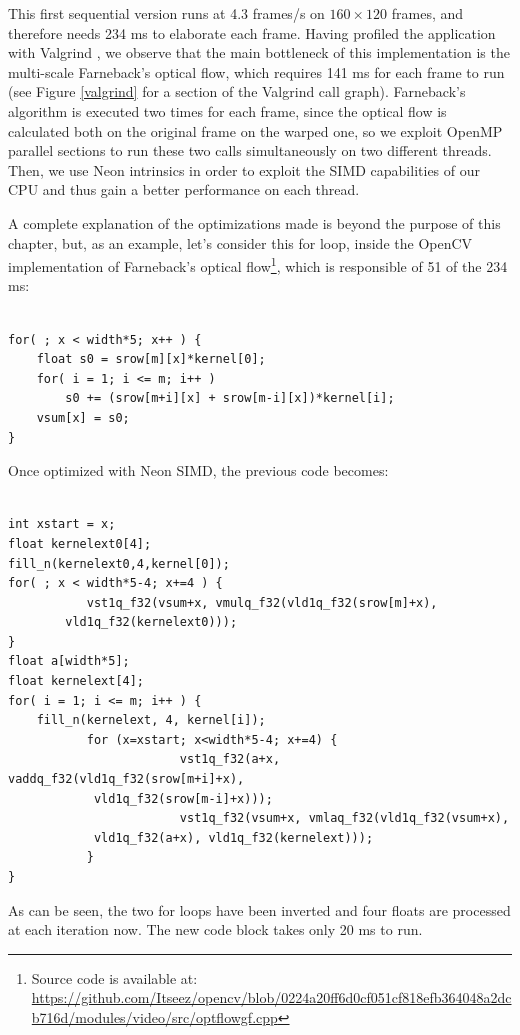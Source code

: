 This first sequential version runs at 4.3 frames/s on $160\times 120$ frames, and therefore needs 234 ms to elaborate each frame. Having profiled the application with Valgrind \cite{nethercote2007valgrind}, we observe that the main bottleneck of this implementation is the multi-scale Farneback's optical flow, which requires 141 ms for each frame to run (see Figure \ref{valgrind} for a section of the Valgrind call graph). Farneback's algorithm is executed two times for each frame, since the optical flow is calculated both on the original frame on the warped one, so we exploit OpenMP parallel sections to run these two calls simultaneously on two different threads. Then, we use Neon intrinsics in order to exploit the SIMD capabilities of our CPU and thus gain a better performance on each thread.

A complete explanation of the optimizations made is beyond the purpose of this chapter, but, as an example, let's consider this for loop, inside the OpenCV implementation of Farneback's optical flow\footnote{Source code is available at: \url{https://github.com/Itseez/opencv/blob/0224a20ff6d0cf051cf818efb364048a2dcb716d/modules/video/src/optflowgf.cpp}}, which is responsible of 51 of the 234 ms:
\begin{lstlisting}[frame=single]  % Start your code-block

for( ; x < width*5; x++ ) {
	float s0 = srow[m][x]*kernel[0];
	for( i = 1; i <= m; i++ )
		s0 += (srow[m+i][x] + srow[m-i][x])*kernel[i];
	vsum[x] = s0;
}
\end{lstlisting}

Once optimized with Neon SIMD, the previous code becomes:
\begin{lstlisting}[frame=single]  % Start your code-block

int xstart = x;
float kernelext0[4];
fill_n(kernelext0,4,kernel[0]);
for( ; x < width*5-4; x+=4 ) {
           vst1q_f32(vsum+x, vmulq_f32(vld1q_f32(srow[m]+x),
		vld1q_f32(kernelext0)));
}
float a[width*5];
float kernelext[4];
for( i = 1; i <= m; i++ ) {
	fill_n(kernelext, 4, kernel[i]);
           for (x=xstart; x<width*5-4; x+=4) {
                        vst1q_f32(a+x, vaddq_f32(vld1q_f32(srow[m+i]+x), 
			vld1q_f32(srow[m-i]+x)));
                        vst1q_f32(vsum+x, vmlaq_f32(vld1q_f32(vsum+x), 
			vld1q_f32(a+x), vld1q_f32(kernelext)));
           }
}
\end{lstlisting}
As can be seen, the two for loops have been inverted and four floats are processed at each iteration now. The new code block takes only 20 ms to run.


